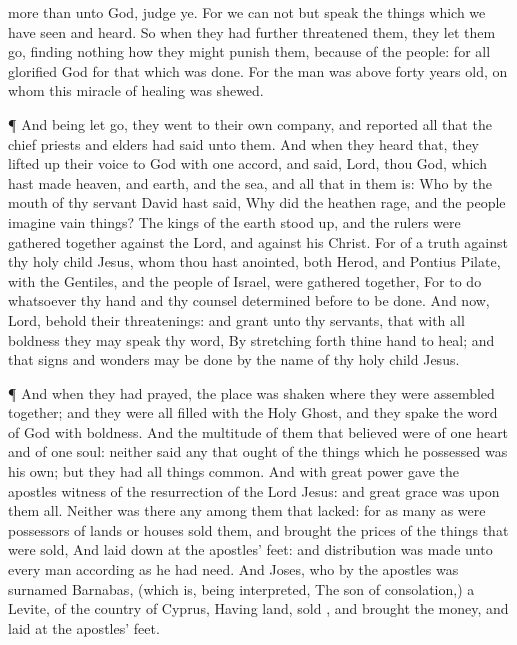 {more
than unto
God, judge
ye.
For
we
can
not
but
speak the things
which we have
seen
and
heard.
So when they had further
threatened
them, they let them
go,
finding
nothing
how they might
punish
them, because
of the
people:
for
all
{}
glorified
God
for
that which was
done.
For the
man
was
above
forty years
old,
on
whom
this
miracle of
healing was
shewed.
\par }{\PP {}¶
And being let
go, they
went
to their own
company,
and
reported all
that the chief
priests
and
elders had
said
unto
them.
And when they
heard
that, they lifted
up their
voice
to
God with one
accord,
and
said,
Lord,
thou
{}
God,
which hast
made
heaven,
and
earth,
and the
sea,
and
all
that
in
them
is:
Who
by the
mouth of
thy
servant
David hast
said,
Why
did the
heathen
rage,
and the
people
imagine vain
things?
The
kings of the
earth stood
up,
and the
rulers were
gathered
together
against the
Lord,
and
against
his
Christ.
For of a
truth
against
thy
holy
child
Jesus,
whom thou hast
anointed,
both
Herod,
and
Pontius
Pilate,
with the
Gentiles,
and the
people of
Israel, were
gathered
together,
For to
do
whatsoever
thy
hand
and
thy
counsel determined
before to be
done.
And
now,
Lord,
behold
their
threatenings:
and
grant
unto
thy
servants, that
with
all
boldness they may
speak
thy
word,
By stretching
forth
thine
hand
to
heal;
and
that
signs
and
wonders may be
done
by the
name
of
thy
holy
child
Jesus.
\par }{\PP {}¶
And
when
they had
prayed, the
place was
shaken
where they
were assembled
together;
and they
were
all
filled with
the
Holy
Ghost,
and they
spake the
word of
God
with
boldness.
And the
multitude of
them
that
believed
were
of
one
heart
and
of
one
soul:
neither
said
any
{}
that ought of the things which he
possessed
was
his
own;
but
they
had all
things
common.
And
with
great
power
gave the
apostles
witness of the
resurrection of the
Lord
Jesus:
and
great
grace
was
upon
them
all.
Neither was
there
any
among
them
that
lacked:
for as many
as
were
possessors of
lands
or
houses sold
them, and
brought the
prices of the things that were
sold,
And
laid
{}
down
at the
apostles’
feet:
and distribution was
made unto every
man according
as
he
had
need.
And
Joses,
who
by the
apostles was
surnamed
Barnabas, (which
is, being
interpreted, The
son of
consolation,) a
Levite,
{} of the country
of
Cyprus,
Having
land,
sold
{},
and
brought the
money,
and
laid
{}
at the
apostles’
feet.

}
